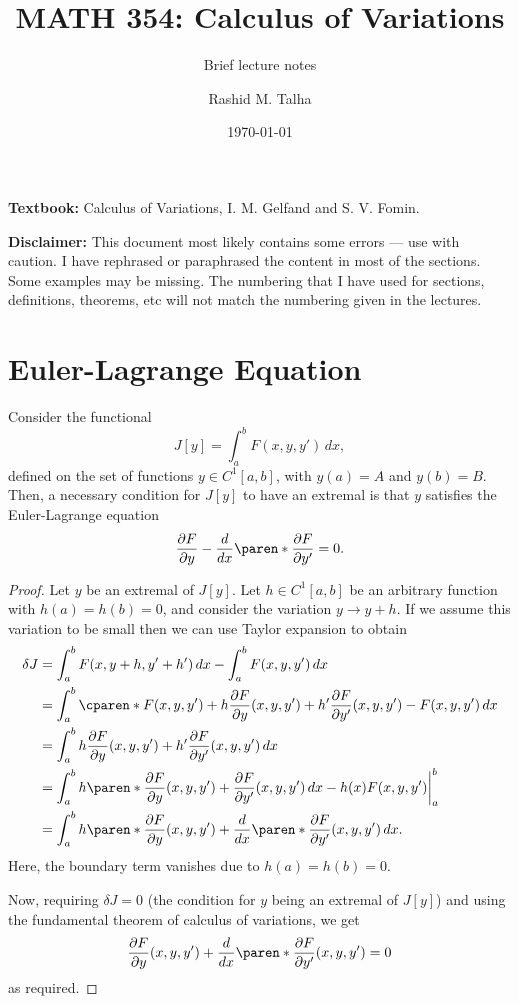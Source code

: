 \documentclass[11pt]{penrose}
\title{MATH 354: Calculus of Variations}
\subtitle{Brief lecture notes}
\author{Rashid M. Talha}
\affiliation{School of Natural Sciences, NUST}
\date{\today}
\begin{document}
\maketitle

\textbf{Textbook:} Calculus of Variations, I. M. Gelfand and S. V. Fomin.

\textbf{Disclaimer:} This document most likely contains some errors --- use with caution. I have rephrased or paraphrased the content in most of the sections. Some examples may be missing. The numbering that I have used for sections, definitions, theorems, etc will not match the numbering given in the lectures.

\section{Euler-Lagrange Equation}
\begin{nthm}
    Consider the functional
    \begin{equation}
        J[y] = \int_{a}^{b} F(x, y, y') \,dx,
    \end{equation}
    defined on the set of functions $y \in C^{1}[a,b]$, with $y(a) = A$ and $y(b) = B$. Then, a necessary condition for $J[y]$ to have an extremal is that $y$ satisfies the Euler-Lagrange equation
    \begin{equation}
        \frac{\pd F}{\pd y} - \frac{d}{dx} \paren*{\frac{\pd F}{\pd y'}} = 0.
        \label{eq:el-basic}
    \end{equation}
\end{nthm}
\begin{proof}
    Let $y$ be an extremal of $J[y]$. Let $h \in C^1 [a,b]$ be an arbitrary function with $h(a)=h(b)=0$, and consider the variation $y \to y+h$. If we assume this variation to be small then we can use Taylor expansion to obtain
    \begin{align}
        \delta J
        &= \int_{a}^{b} F(x, y+h, y'+h') \,dx - \int_{a}^{b} F(x, y, y') \,dx\\
        &= \int_{a}^{b} \cparen*{F(x, y, y') + h \frac{\pd F}{\pd y}(x, y, y') + h' \frac{\pd F}{\pd y'}(x, y, y') - F(x, y, y')} \,dx\\
        &= \int_{a}^{b} h \frac{\pd F}{\pd y}(x, y, y') + h' \frac{\pd F}{\pd y'}(x, y, y') \,dx\\
        &= \int_{a}^{b} h \paren*{ \frac{\pd F}{\pd y}(x, y, y') + \frac{\pd F}{\pd y'}(x, y, y') } \,dx - \bigg. h(x) F(x, y, y') \bigg|_a^b\\
        &= \int_{a}^{b} h \paren*{ \frac{\pd F}{\pd y}(x, y, y') + \frac{d}{dx} \paren*{ \frac{\pd F}{\pd y'}(x, y, y')} } \,dx.
    \end{align}
    Here, the boundary term vanishes due to $h(a)=h(b)=0$.

    Now, requiring $\delta J = 0$ (the condition for $y$ being an extremal of $J[y]$) and using the fundamental theorem of calculus of variations, we get
    \begin{equation}
        \frac{\pd F}{\pd y}(x, y, y') + \frac{d}{dx} \paren*{ \frac{\pd F}{\pd y'}(x, y, y')} = 0
    \end{equation}
    as required.
\end{proof}
\end{document}
